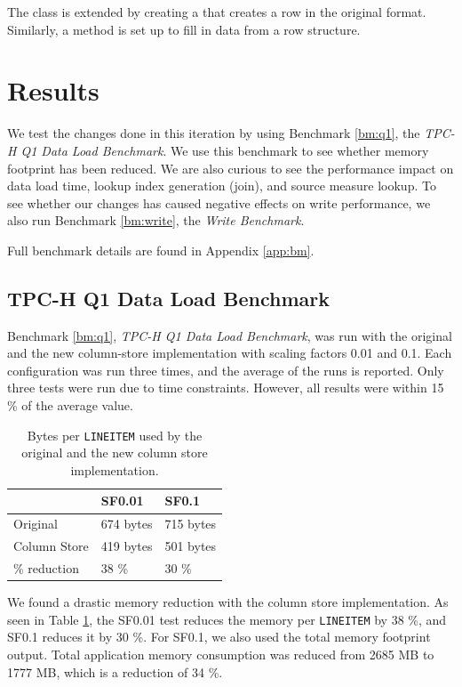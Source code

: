 The class is extended by creating a  that creates a row in the original format. Similarly, a method  is set up to fill in data from a row structure.

\section{Results}
\label{sec:Results}
We test the changes done in this iteration by using Benchmark \ref{bm:q1}, the \textit{TPC-H Q1 Data Load Benchmark}. We use this benchmark to see whether memory footprint has been reduced. We are also curious to see the performance impact on data load time, lookup index generation (join), and source measure lookup. To see whether our changes has caused negative effects on write performance, we also run Benchmark \ref{bm:write}, the \textit{Write Benchmark}. 

Full benchmark details are found in Appendix \ref{app:bm}.

\subsection{TPC-H Q1 Data Load Benchmark}
\label{column-store:q1}
Benchmark \ref{bm:q1}, \textit{TPC-H Q1 Data Load Benchmark}, was run with the original and the new column-store implementation with scaling factors 0.01 and 0.1. Each configuration was run three times, and the average of the runs is reported. Only three tests were run due to time constraints. However, all results were within 15 \% of the average value.

\begin{table}
    \centering
    \begin{tabularx}{0.75\textwidth}{X | X X}
        & SF0.01 & SF0.1 \\ 
        \hline
        \hline
        Original & 674 bytes & 715 bytes \\
        Column Store & 419 bytes & 501 bytes \\
        \% reduction & 38 \% & 30 \% \\
    \end{tabularx}
    \caption{Bytes per \texttt{LINEITEM} used by the original and the new column store implementation.} 
    \label{tab:non-blackbox-bpl}
\end{table}
We found a drastic memory reduction with the column store implementation. As seen in Table \ref{tab:non-blackbox-bpl}, the SF0.01 test reduces the memory per \texttt{LINEITEM} by 38 \%, and SF0.1 reduces it by 30 \%. For SF0.1, we also used the total memory footprint output. Total application memory consumption was reduced from 2685 MB to 1777 MB, which is a reduction of 34 \%.

